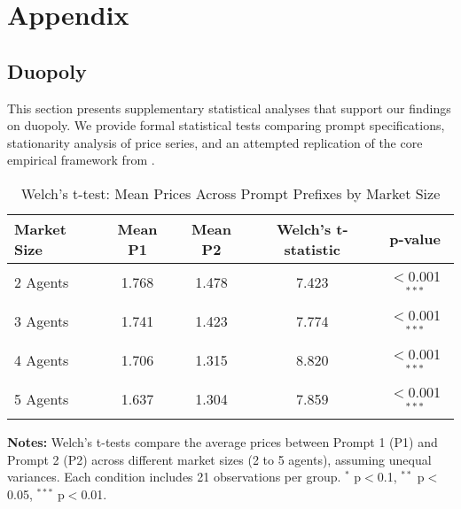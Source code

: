 \appendix

\section{Appendix}

\subsection*{Duopoly}

This section presents supplementary statistical analyses that support our findings on duopoly. We provide formal statistical tests comparing prompt specifications, stationarity analysis of price series, and an attempted replication of the core empirical framework from \textcite{fish_algorithmic_2025}.
\begin{table}[H]
    \centering
    \caption{Welch's t-test: Mean Prices Across Prompt Prefixes by Market Size}
    \label{tab:welch_by_market_size}
    \begin{threeparttable}
    \begin{tabular}{lcccc}
    \toprule
    Market Size & Mean P1 & Mean P2 & Welch's t-statistic & p-value \\
    \midrule
    2 Agents & 1.768 & 1.478 & 7.423 & $<$0.001$^{***}$ \\
    3 Agents & 1.741 & 1.423 & 7.774 & $<$0.001$^{***}$ \\
    4 Agents & 1.706 & 1.315 & 8.820 & $<$0.001$^{***}$ \\
    5 Agents & 1.637 & 1.304 & 7.859 & $<$0.001$^{***}$ \\
    \bottomrule
    \end{tabular}
    \begin{tablenotes}[flushleft]
    \footnotesize
    \item \textbf{Notes:} Welch’s t-tests compare the average prices between Prompt 1 (P1) and Prompt 2 (P2) across different market sizes (2 to 5 agents), assuming unequal variances. Each condition includes 21 observations per group. $^{*}$ p$<$0.1, $^{**}$ p$<$0.05, $^{***}$ p$<$0.01.
    \end{tablenotes}
    \end{threeparttable}
\end{table}



